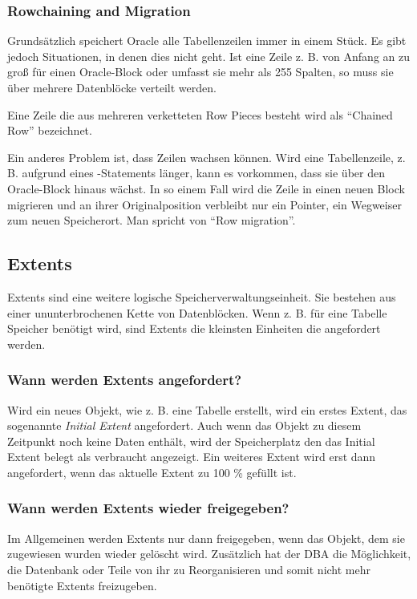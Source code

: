         \subsubsection{Rowchaining and Migration}
          Grunds\"atzlich speichert Oracle alle Tabellenzeilen immer in einem St\"uck. Es gibt jedoch Situationen, in denen dies nicht geht. Ist eine Zeile z. B. von Anfang an zu gro\ss{} f\"ur einen Oracle-Block oder umfasst sie mehr als 255 Spalten, so muss sie \"uber mehrere Datenbl\"ocke verteilt werden.
          \begin{merke}
            Eine Zeile die aus mehreren verketteten Row Pieces besteht wird als \enquote{Chained Row} bezeichnet.
          \end{merke}
          Ein anderes Problem ist, dass Zeilen wachsen k\"onnen. Wird eine Tabellenzeile, z. B. aufgrund eines -Statements l\"anger, kann es vorkommen, dass sie \"uber den Oracle-Block hinaus w\"achst. In so einem Fall wird die Zeile in einen neuen Block migrieren und an ihrer Originalposition verbleibt nur ein Pointer, ein Wegweiser zum neuen Speicherort. Man spricht von \enquote{Row migration}.
      \subsection{Extents}
        Extents sind eine weitere logische Speicherverwaltungseinheit. Sie bestehen aus einer ununterbrochenen Kette von Datenbl\"ocken. Wenn z. B. f\"ur  eine Tabelle Speicher ben\"otigt wird, sind Extents die kleinsten Einheiten die angefordert werden.
        \subsubsection{Wann werden Extents angefordert?}
          Wird ein neues Objekt, wie z. B. eine Tabelle erstellt, wird ein erstes Extent, das sogenannte \textit{Initial Extent} angefordert. Auch wenn das Objekt zu diesem Zeitpunkt noch keine Daten enth\"alt, wird der Speicherplatz den das Initial Extent belegt als verbraucht angezeigt. Ein weiteres Extent wird erst dann angefordert, wenn das aktuelle Extent zu 100 \% gef\"ullt ist.
        \subsubsection{Wann werden Extents wieder freigegeben?}
          Im Allgemeinen werden Extents nur dann freigegeben, wenn das Objekt, dem sie zugewiesen wurden wieder gel\"oscht wird. Zus\"atzlich hat der DBA die M\"oglichkeit, die Datenbank oder Teile von ihr zu Reorganisieren und somit nicht mehr ben\"otigte Extents freizugeben.
